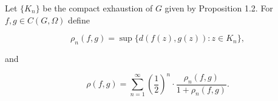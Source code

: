 Let $\{K_n\}$ be the compact exhaustion of $G$ given by Proposition 1.2. For $f, g \in C(G, \Omega)$ define

$$\rho_n(f, g) = \sup \{d(f(z), g(z)) : z \in K_n\},$$

and

$$\rho(f, g) = \sum_{n=1}^{\infty} \left(\frac{1}{2}\right)^n \cdot \frac{\rho_n(f, g)}{1 + \rho_n(f, g)}.$$
